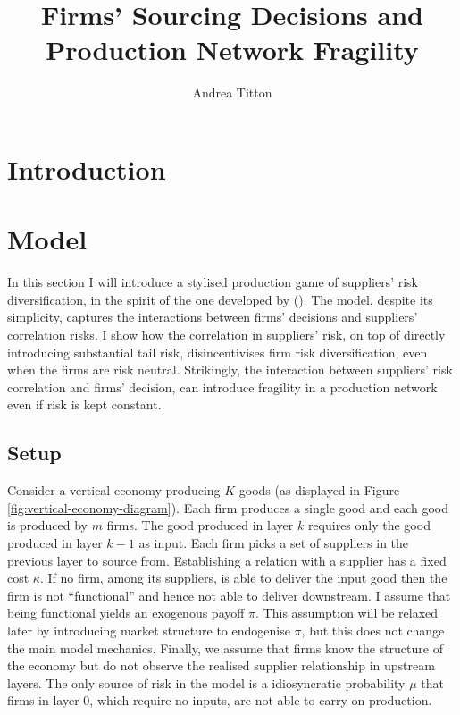 \documentclass[american, abstract=on]{scrartcl}
\author{Andrea Titton}
\title{Firms' Sourcing Decisions and\\ Production Network Fragility}
\theoremstyle{plain}
\newcommand{\citein}[1]{\citeauthor{#1} (\citeyear{#1})}
\begin{document}
\maketitle
\section{Introduction}

\section{Model}

In this section I will introduce a stylised production game of suppliers' risk diversification, in the spirit of the one developed by \citein{elliott_supply_2022}. The model, despite its simplicity, captures the interactions between firms’ decisions and suppliers’ correlation risks. I show how the correlation in suppliers’ risk, on top of directly introducing substantial tail risk, disincentivises firm risk diversification, even when the firms are risk neutral. Strikingly, the interaction between suppliers’ risk correlation and firms’ decision, can introduce fragility in a production network even if risk is kept constant.

\subsection{Setup}

Consider a vertical economy producing $K$ goods (as displayed in Figure \ref{fig:vertical-economy-diagram}). Each firm produces a single good and each good is produced by $m$ firms. The good produced in layer $k$ requires only the good produced in layer $k - 1$ as input. Each firm picks a set of suppliers in the previous layer to source from. Establishing a relation with a supplier has a fixed cost $\kappa$. If no firm, among its suppliers, is able to deliver the input good then the firm is not ``functional'' and hence not able to deliver downstream. I assume that being functional yields an exogenous payoff $\pi$. This assumption will be relaxed later by introducing market structure to endogenise $\pi$, but this does not change the main model mechanics. Finally, we assume that firms know the structure of the economy but do not observe the realised supplier relationship in upstream layers. The only source of risk in the model is a idiosyncratic probability $\mu$ that firms in layer $0$, which require no inputs, are not able to carry on production.
\end{document}
